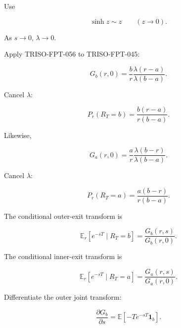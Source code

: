 \documentclass[11pt,a4paper]{article}
\begin{document}
Use

\begin{equation}
\sinh z\sim z
\qquad(z\rightarrow0).
\tag{TRISO-FPT-056}
\label{eq:triso-fpt-056}
\end{equation}

As $s\rightarrow0$, $\lambda\rightarrow0$.

Apply TRISO-FPT-056 to TRISO-FPT-045:

\begin{equation}
G_b(r,0)
=
\frac br
\frac{\lambda(r-a)}
{\lambda(b-a)}.
\tag{TRISO-FPT-057}
\label{eq:triso-fpt-057}
\end{equation}

Cancel $\lambda$:

\begin{equation}
\boxed{
P_r(R_T=b)
=
\frac{b(r-a)}{r(b-a)}.
}
\tag{TRISO-FPT-058}
\label{eq:triso-fpt-058}
\end{equation}

Likewise,

\begin{equation}
G_a(r,0)
=
\frac ar
\frac{\lambda(b-r)}
{\lambda(b-a)}.
\tag{TRISO-FPT-059}
\label{eq:triso-fpt-059}
\end{equation}

Cancel $\lambda$:

\begin{equation}
\boxed{
P_r(R_T=a)
=
\frac{a(b-r)}{r(b-a)}.
}
\tag{TRISO-FPT-060}
\label{eq:triso-fpt-060}
\end{equation}

The conditional outer-exit transform is

\begin{equation}
\boxed{
\mathbb E_r[e^{-sT}\mid R_T=b]
=
\frac{G_b(r,s)}{G_b(r,0)}.
}
\tag{TRISO-FPT-061}
\label{eq:triso-fpt-061}
\end{equation}

The conditional inner-exit transform is

\begin{equation}
\boxed{
\mathbb E_r[e^{-sT}\mid R_T=a]
=
\frac{G_a(r,s)}{G_a(r,0)}.
}
\tag{TRISO-FPT-062}
\label{eq:triso-fpt-062}
\end{equation}

Differentiate the outer joint transform:

\begin{equation}
\frac{\partial G_b}{\partial s}
=
\mathbb E[-Te^{-sT}\mathbf1_b].
\tag{TRISO-FPT-063}
\label{eq:triso-fpt-063}
\end{equation}
\end{document}
